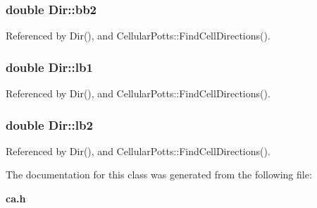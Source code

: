 \subsubsection[{bb2}]{\setlength{\rightskip}{0pt plus 5cm}double Dir\-::bb2}\label{classDir_aa578cc4eff239f8e446b63a845d1863d}


Referenced by Dir(), and Cellular\-Potts\-::\-Find\-Cell\-Directions().

\subsubsection[{lb1}]{\setlength{\rightskip}{0pt plus 5cm}double Dir\-::lb1}\label{classDir_a4b1989ae87c3b9c674f11a43bc99eccf}


Referenced by Dir(), and Cellular\-Potts\-::\-Find\-Cell\-Directions().

\subsubsection[{lb2}]{\setlength{\rightskip}{0pt plus 5cm}double Dir\-::lb2}\label{classDir_a5385fd570923d98e5d4d5ae12e5ca320}


Referenced by Dir(), and Cellular\-Potts\-::\-Find\-Cell\-Directions().



The documentation for this class was generated from the following file\-:\begin{DoxyCompactItemize}
\item 
{\bf ca.\-h}\end{DoxyCompactItemize}
